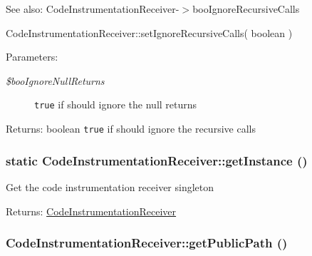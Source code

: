 \begin{Desc}
\item[See also:]CodeInstrumentationReceiver-$>$booIgnoreRecursiveCalls 

CodeInstrumentationReceiver::setIgnoreRecursiveCalls( boolean ) \end{Desc}
\begin{Desc}
\item[Parameters:]
\begin{description}
\item[{\em \$booIgnoreNullReturns}]{\tt true} if should ignore the null returns \end{description}
\end{Desc}
\begin{Desc}
\item[Returns:]boolean {\tt true} if should ignore the recursive calls \end{Desc}
\hypertarget{class_code_instrumentation_receiver_7a8b6e3e36c2e6d9fb87f11c8f0aae9b}{
\subsubsection[{getInstance}]{\setlength{\rightskip}{0pt plus 5cm}static CodeInstrumentationReceiver::getInstance ()}}
\label{class_code_instrumentation_receiver_7a8b6e3e36c2e6d9fb87f11c8f0aae9b}


Get the code instrumentation receiver singleton

\begin{Desc}
\item[Returns:]\hyperlink{class_code_instrumentation_receiver}{CodeInstrumentationReceiver} \end{Desc}
\hypertarget{class_code_instrumentation_receiver_7eceb6a70b026359b2428df86b7e1d5d}{
\subsubsection[{getPublicPath}]{\setlength{\rightskip}{0pt plus 5cm}CodeInstrumentationReceiver::getPublicPath ()}}
\label{class_code_instrumentation_receiver_7eceb6a70b026359b2428df86b7e1d5d}


